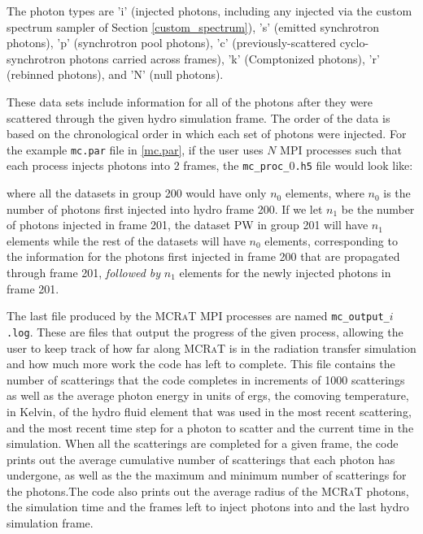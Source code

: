 \documentclass[12pt,a4paper]{article}
\newcommand{\mcrat}{\textsc{MCRaT}}
\begin{document}
The photon types are 'i' (injected photons, including any injected via the custom spectrum sampler of Section \ref{custom_spectrum}), 's' (emitted synchrotron photons), 'p' (synchrotron pool photons), 'c' (previously-scattered cyclo-synchrotron photons carried across frames), 'k' (Comptonized photons), 'r' (rebinned photons), and 'N' (null photons).

These data sets include information for all of the photons after they were scattered through the given hydro simulation frame. The order of the data is based on the chronological order in which each set of photons were injected. For the example \texttt{mc.par} file in \autoref{mc.par}, if the user uses $N$ MPI processes such that each process injects photons into 2 frames, the \texttt{mc\_proc\_$0$.h5} file would look like:
\begin{figure}[h!]
 \end{figure}
 
\newpage where all the datasets in group 200 would have only $n_{0}$ elements, where $n_{0}$ is the number of photons first injected into hydro frame 200. If we let $n_{1}$ be the number of photons injected in frame 201, the dataset PW in group 201 will have $n_{1}$ elements while the rest of the datasets will have $n_{0}$ elements, corresponding to the information for the photons first injected in frame 200 that are propagated through frame 201, \textit{followed by} $n_{1}$ elements for the newly injected photons in frame 201. 

The last file produced by the \mcrat{} MPI processes are named \texttt{mc\_output\_$i$.log}. These are files that output the progress of the given process, allowing the user to keep track of how far along \mcrat{} is in the radiation transfer simulation and how much more work the code has left to complete. This file contains the number of scatterings that the code completes in increments of 1000 scatterings as well as the average photon energy in units of ergs, the comoving temperature, in Kelvin, of the hydro fluid element that was used in the most recent scattering, and the most recent time step for a photon to scatter and the current time in the simulation. When all the scatterings are completed for a given frame, the code prints out the average cumulative number of scatterings that each photon has undergone, as well as the the maximum and minimum number of scatterings for the photons.The code also prints out the average radius of the \mcrat{} photons, the simulation time and the frames left to inject photons into and the last hydro simulation frame.
\end{document}
